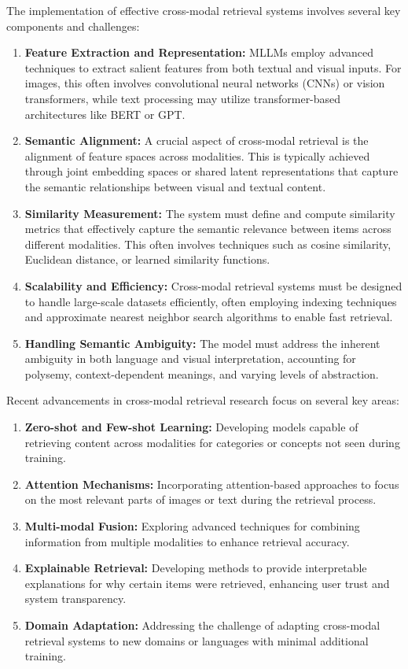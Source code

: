 The implementation of effective cross-modal retrieval systems involves several key components and challenges:

\begin{enumerate}
    \item \textbf{Feature Extraction and Representation:} MLLMs employ advanced techniques to extract salient features from both textual and visual inputs. For images, this often involves convolutional neural networks (CNNs) or vision transformers, while text processing may utilize transformer-based architectures like BERT or GPT.
    \item \textbf{Semantic Alignment:} A crucial aspect of cross-modal retrieval is the alignment of feature spaces across modalities. This is typically achieved through joint embedding spaces or shared latent representations that capture the semantic relationships between visual and textual content.
    \item \textbf{Similarity Measurement:} The system must define and compute similarity metrics that effectively capture the semantic relevance between items across different modalities. This often involves techniques such as cosine similarity, Euclidean distance, or learned similarity functions.
    \item \textbf{Scalability and Efficiency:} Cross-modal retrieval systems must be designed to handle large-scale datasets efficiently, often employing indexing techniques and approximate nearest neighbor search algorithms to enable fast retrieval.
    \item \textbf{Handling Semantic Ambiguity:} The model must address the inherent ambiguity in both language and visual interpretation, accounting for polysemy, context-dependent meanings, and varying levels of abstraction.
\end{enumerate}


Recent advancements in cross-modal retrieval research focus on several key areas:

\begin{enumerate}
    \item \textbf{Zero-shot and Few-shot Learning:} Developing models capable of retrieving content across modalities for categories or concepts not seen during training.
    \item \textbf{Attention Mechanisms:} Incorporating attention-based approaches to focus on the most relevant parts of images or text during the retrieval process.
    \item \textbf{Multi-modal Fusion:} Exploring advanced techniques for combining information from multiple modalities to enhance retrieval accuracy.
    \item \textbf{Explainable Retrieval:} Developing methods to provide interpretable explanations for why certain items were retrieved, enhancing user trust and system transparency.
    \item \textbf{Domain Adaptation:} Addressing the challenge of adapting cross-modal retrieval systems to new domains or languages with minimal additional training.
\end{enumerate}


